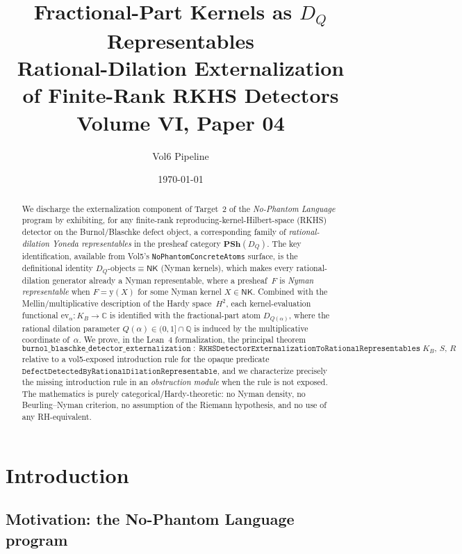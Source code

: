 \documentclass[12pt]{article}
\title{Fractional-Part Kernels as $D_Q$ Representables\\
\large{Rational-Dilation Externalization of Finite-Rank RKHS Detectors}\\
\large{Volume VI, Paper 04}}
\author{Vol6 Pipeline}
\date{\today}
\theoremstyle{plain}
\theoremstyle{definition}
\theoremstyle{remark}
\newcommand{\KB}{K_{B}}
\newcommand{\HardyTwo}{H^{2}}
\newcommand{\Complex}{\mathbb{C}}
\newcommand{\Rationals}{\mathbb{Q}}
\newcommand{\Yon}{\mathrm{y}}
\newcommand{\PSh}{\mathbf{PSh}}
\newcommand{\DQ}{D_{Q}}
\newcommand{\NK}{\mathsf{NK}}
\begin{document}
\maketitle

\begin{abstract}
We discharge the externalization component of Target~2 of the
\emph{No-Phantom Language} program by exhibiting, for any finite-rank
reproducing-kernel-Hilbert-space (RKHS) detector on the Burnol/Blaschke
defect object, a corresponding family of \emph{rational-dilation Yoneda
representables} in the presheaf category $\PSh(\DQ)$.  The key
identification, available from Vol5's \texttt{NoPhantomConcreteAtoms}
surface, is the definitional identity $\DQ\text{-objects}\equiv
\NK$ (Nyman kernels), which makes every rational-dilation generator
already a Nyman representable, where a presheaf~$F$ is \emph{Nyman
representable} when $F = \Yon(X)$ for some Nyman kernel
$X\in\NK$.  Combined with the Mellin/multiplicative
description of the Hardy space~$\HardyTwo$, each kernel-evaluation
functional $\mathrm{ev}_{\alpha}\colon \KB\to\Complex$ is identified
with the fractional-part atom $D_{Q(\alpha)}$, where the rational
dilation parameter $Q(\alpha)\in (0,1]\cap\Rationals$ is induced by the
multiplicative coordinate of~$\alpha$.  We prove, in the Lean~4
formalization, the principal theorem
\[
  \texttt{burnol\_blaschke\_detector\_externalization}\;:\;
  \texttt{RKHSDetectorExternalizationToRationalRepresentables}\;\KB,\,
  S,\, R
\]
relative to a vol5-exposed introduction rule for the opaque predicate
$\texttt{DefectDetectedByRationalDilationRepresentable}$, and we
characterize precisely the missing introduction rule in an
\emph{obstruction module} when the rule is not exposed.  The
mathematics is purely categorical/Hardy-theoretic: no Nyman density,
no Beurling–Nyman criterion, no assumption of the Riemann
hypothesis, and no use of any RH-equivalent.
\end{abstract}

\tableofcontents

\section{Introduction}
\label{sec:intro}

\subsection{Motivation: the No-Phantom Language program}
\end{document}
